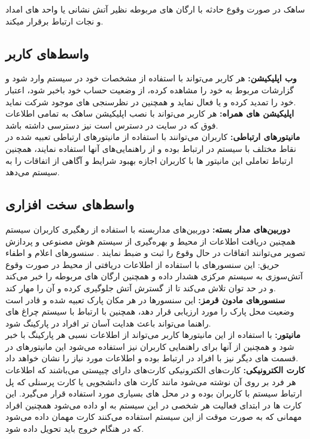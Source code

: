 \documentclass[oneside,a4paper,12pt]{book}
\begin{document}
	\noindent
	ساهک در صورت وقوع حادثه با ارگان های مربوطه نظیر آتش نشانی یا واحد های امداد و نجات ارتباط برقرار میکند.
	\subsection{واسط‌های کاربر}
	\noindent\textbf{وب اپلیکیشن:} هر کاربر می‌تواند با استفاده از مشخصات خود در سیستم وارد شود و گزارشات مربوط به خود را مشاهده کرده، از وضعیت حساب خود باخبر شود، اعتبار خود را تمدید کرده و یا فعال نماید و همچنین در نظرسنجی های موجود شرکت نماید.\\
	
	\noindent\textbf{اپلیکیشن های همراه:} هر کاربر می‌تواند با نصب اپلیکیشن ساهک به تمامی اطلاعات فوق که در سایت در دسترس است نیز دسترسی داشته باشد.\\
	
	\noindent\textbf{مانیتورهای ارتباطی:} کاربران می‌توانند با استفاده از مانیتورهای ارتباطی تعبیه شده در نقاط مختلف با سیستم در ارتباط بوده و از راهنمایی‌های آنها استفاده نمایند، همچنین ارتباط تعاملی این مانیتور ها با کاربران اجازه بهبود شرایط و آگاهی از اتفاقات را به سیستم می‌دهد.
	
	\subsection{واسط‌های سخت افزاری}
	\noindent\textbf{دوربین‌های مدار بسته:} دوربین‌های مداربسته با استفاده از رهگیری کاربران سیستم همچنین دریافت اطلاعات از محیط و بهره‌گیری از سیستم هوش مصنوعی و پردازش تصویر می‌توانند اتفاقات در حال وقوع را ثبت و ضبط نمایند .
	سنسورهای اعلام و اطفاء حریق: این سنسورهای با استفاده از اطلاعات دریافتی از محیط در صورت وقوع آتش‌سوزی به سیستم مرکزی هشدار داده و همچنین ارگان های مربوطه را خبر می‌کند و در حد توان تلاش می‌کند تا از گسترش آتش جلوگیری کرده و آن را مهار کند.\\
	
	\noindent\textbf{سنسورهای مادون قرمز:} این سنسورها در هر مکان پارک تعبیه شده و قادر است وضعیت محل پارک را مورد ارزیابی قرار دهد، همچنین با ارتباط با سیستم چراغ های راهنما می‌تواند باعث هدایت آسان تر افراد در پارکینگ شود.\\
	
	\noindent\textbf{مانیتور:} با استفاده از این مانیتورها کاربر می‌تواند از اطلاعات نسبی هر پارکینگ با خبر شود و همچنین از آنها برای راهنمایی کاربران نیز استفاده می‌شود این مانیتورهای در قسمت های دیگر نیز با افراد در ارتباط بوده و اطلاعات مورد نیاز را نشان خواهد داد.\\
	
	\noindent\textbf{کارت الکترونیکی:} کارت‌های الکترونیکی کارت‌های دارای چیپستی می‌باشند که اطلاعات هر فرد بر روی آن نوشته می‌شود مانند کارت های دانشجویی یا کارت پرسنلی که پل ارتباط سیستم با کاربران بوده و در محل های بسیاری مورد استفاده قرار می‌گیرد. این کارت ها در ابتدای فعالیت هر شخصی در این سیستم به او داده می‌شود همچنین افراد مهمانی که به صورت موقت از این سیستم استفاده می‌کنند کارت مهمان داده می‌شود که در هنگام خروج باید تحویل داده شود. \\
	
\end{document}

